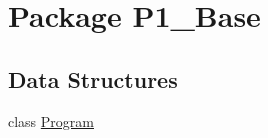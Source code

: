 \hypertarget{namespace_p1___base}{\section{Package P1\-\_\-\-Base}
\label{namespace_p1___base}
}
\subsection*{Data Structures}
\begin{DoxyCompactItemize}
\item 
class \hyperlink{class_p1___base_1_1_program}{Program}
\end{DoxyCompactItemize}
